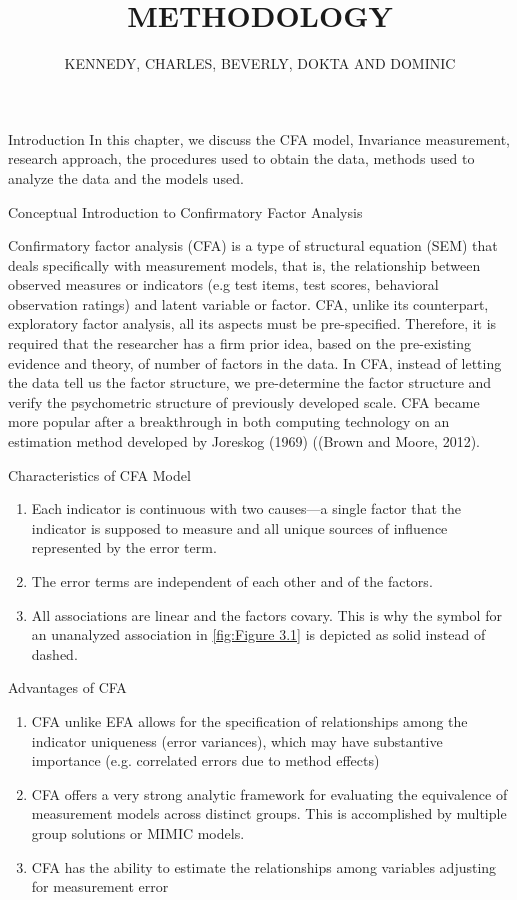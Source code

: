 \documentclass{beamer}
\title{METHODOLOGY}
\author{KENNEDY, CHARLES, BEVERLY, DOKTA AND DOMINIC}
\begin{document}
	\maketitle
	\begin{frame}{Introduction}
		In this chapter, we discuss the CFA model, Invariance measurement, research approach, the procedures used to obtain the data, methods used to analyze the data and the models used.
	\end{frame}
\begin{frame}{Conceptual Introduction to Confirmatory Factor Analysis}
	
	Confirmatory factor analysis (CFA) is a type of structural equation (SEM) that deals specifically with measurement models, that is, the relationship between observed measures or indicators (e.g test items, test scores, behavioral observation ratings) and latent variable or factor. CFA, unlike its counterpart, exploratory factor analysis, all its aspects must be pre-specified. Therefore, it is required that the researcher has a firm prior idea, based on the pre-existing evidence and theory, of
	number of factors in the data. In CFA, instead of letting the data tell us the factor structure, we pre-determine the factor structure and verify the psychometric structure of previously developed scale. CFA became more popular after a breakthrough in both computing technology on an estimation method developed by Joreskog (1969) ((Brown and Moore, 2012).
\end{frame}
\begin{frame}{Characteristics of CFA Model}
	\begin{enumerate}
		\item Each indicator is continuous with two causes—a single factor that the indicator is supposed to measure and all unique sources of influence represented by the error term.
		\item The error terms are independent of each other and of the factors.
		\item All associations are linear and the factors covary. This is why the symbol for an unanalyzed association in \ref{fig:Figure 3.1} is depicted as solid instead of dashed.
	\end{enumerate}
\end{frame}
\begin{frame}{Advantages of CFA}
	\begin{enumerate}
		\item CFA unlike EFA allows for the specification of relationships among the indicator uniqueness (error variances), which may have substantive importance (e.g. correlated errors due to method effects)
		\item CFA offers a very strong analytic framework for evaluating the equivalence of measurement models across distinct groups. This is accomplished by multiple group solutions or MIMIC models.
		\item CFA has the ability to estimate the relationships among variables adjusting for measurement error
	\end{enumerate}
\end{frame}
\end{document}
